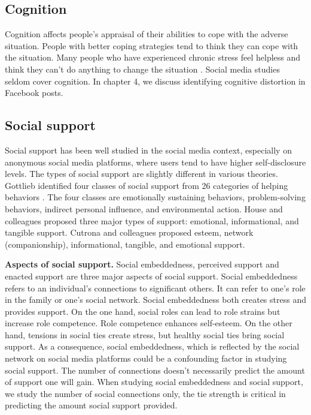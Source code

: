 \subsection{Cognition}
Cognition affects people's appraisal of their abilities to cope with the adverse situation. People with better coping strategies tend to think they can cope with the situation. Many people who have experienced chronic stress feel helpless and think they can't do anything to change the situation \cite{rutter1985resilience}. Social media studies seldom cover cognition. In chapter 4, we discuss identifying cognitive distortion in Facebook posts.

\subsection{Social support}
Social support has been well studied in the social media context, especially on anonymous social media platforms, where users tend to have higher self-disclosure levels. The types of social support are slightly different in various theories. Gottlieb identified four classes of social support from 26 categories of helping behaviors \cite{gottlieb1978development}. The four classes are emotionally sustaining behaviors, problem-solving behaviors, indirect personal influence, and environmental action. House and colleagues \citet{house1985social} proposed three major types of support: emotional, informational, and tangible support. Cutrona and colleagues \citet{cutrona1990interpersonal} proposed esteem, network (companionship), informational, tangible, and emotional support.

\textbf{Aspects of social support.} Social embeddedness, perceived support and enacted support are three major aspects of social support. Social embeddedness refers to an individual's connections to significant others. It can refer to one's role in the family or one's social network. Social embeddedness both creates stress and provides support. On the one hand, social roles can lead to role strains but increase role competence. Role competence enhances self-esteem. On the other hand, tensions in social ties create stress, but healthy social ties bring social support. As a consequence, social embeddedness, which is reflected by the social network on social media platforms could be a confounding factor in studying social support. The number of connections doesn't necessarily predict the amount of support one will gain. When studying social embeddedness and social support, we study the number of social connections only, the tie strength is critical in predicting the amount social support provided.


